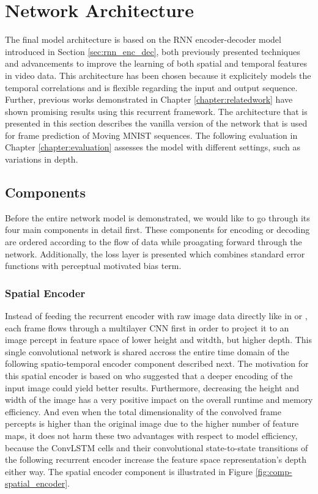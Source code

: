 \section{Network Architecture}

The final model architecture is based on the RNN encoder-decoder model introduced in Section \ref{sec:rnn_enc_dec}, both previously presented techniques and advancements to improve the learning of both spatial and temporal features in video data. This architecture has been chosen because it explicitely models the temporal correlations and is flexible regarding the input and output sequence. Further, previous works demonstrated in Chapter \ref{chapter:relatedwork} have shown promising results using this recurrent framework. The architecture that is presented in this section describes the vanilla version of the network that is used for frame prediction of Moving MNIST sequences. The following evaluation in Chapter \ref{chapter:evaluation} assesses the model with different settings, such as variations in depth.

\subsection{Components}

Before the entire network model is demonstrated, we would like to go through its four main components in detail first. These components for encoding or decoding are ordered according to the flow of data while proagating forward through the network. Additionally, the loss layer is presented which combines standard error functions with perceptual motivated bias term.

\subsubsection{Spatial Encoder}

Instead of feeding the recurrent encoder with raw image data directly like in \parencite{unsup_learn_lstm} or \parencite{conv_lstm_nowcasting}, each frame flows through a multilayer CNN first in order to project it to an image percept in feature space of lower height and witdth, but higher depth. This single convolutional network is shared accross the entire time domain of the following spatio-temporal encoder component described next. The motivation for this spatial encoder is based on \parencite{spat_temp_video_autoenc} who suggested that a deeper encoding of the input image could yield better results. Furthermore, decreasing the height and width of the image has a very positive impact on the overall runtime and memory efficiency. And even when the total dimensionality of the convolved frame percepts is higher than the original image due to the higher number of feature maps, it does not harm these two advantages with respect to model efficiency, because the ConvLSTM cells and their convolutional state-to-state transitions of the following recurrent encoder increase the feature space representation's depth either way. The spatial encoder component is illustrated in Figure \ref{fig:comp-spatial_encoder}.

